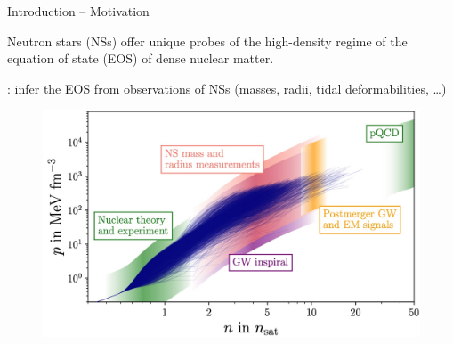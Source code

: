 \documentclass[usenames,dvipsnames,t]{beamer}
\begin{document}







\begin{frame}{Introduction -- Motivation}
  \def\x{4mm}
  
  Neutron stars (NSs) offer unique probes of the high-density regime of the equation of state (EOS) of dense nuclear matter.

  \vspace{\x}

  : infer the EOS from observations of NSs (masses, radii, tidal deformabilities, \dots)

  \begin{figure}
    \centering
    \includegraphics[width=0.75\linewidth]{Figures/Koehn_EOS.jpg}
  \end{figure}

\end{frame}


  

    
\end{document}
